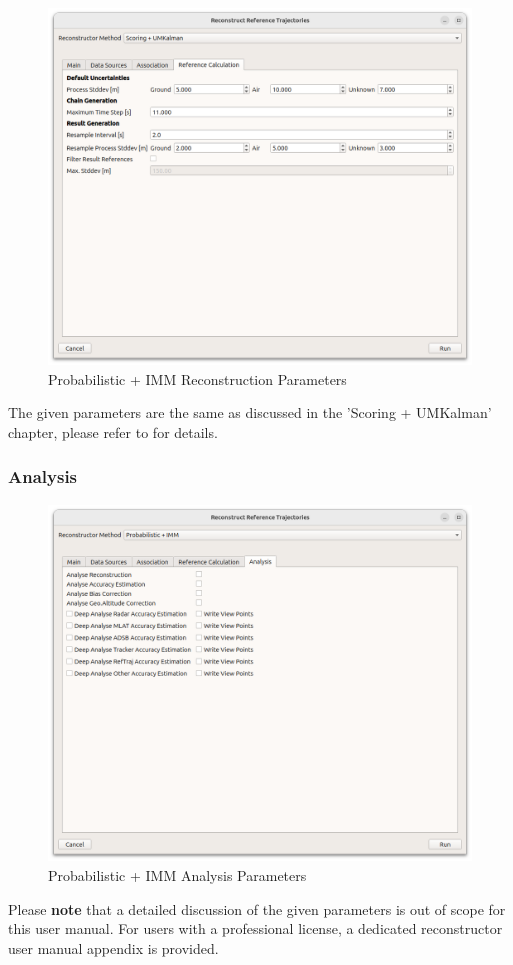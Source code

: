 \begin{figure}[H]
    \center
      \includegraphics[width=16cm]{figures/dialog_ref_calc.png}
    \caption{Probabilistic + IMM Reconstruction Parameters}
\end{figure}

The given parameters are the same as discussed in the 'Scoring + UMKalman' chapter, please refer to  for details.

\subsubsection{Analysis}

\begin{figure}[H]
    \center
      \includegraphics[width=16cm]{figures/dialog_probimm_analyse.png}
    \caption{Probabilistic + IMM Analysis Parameters}
\end{figure}

Please \textbf{note} that a detailed discussion of the given parameters is out of scope for this user manual. For users with a professional license, a dedicated reconstructor user manual appendix is provided.
